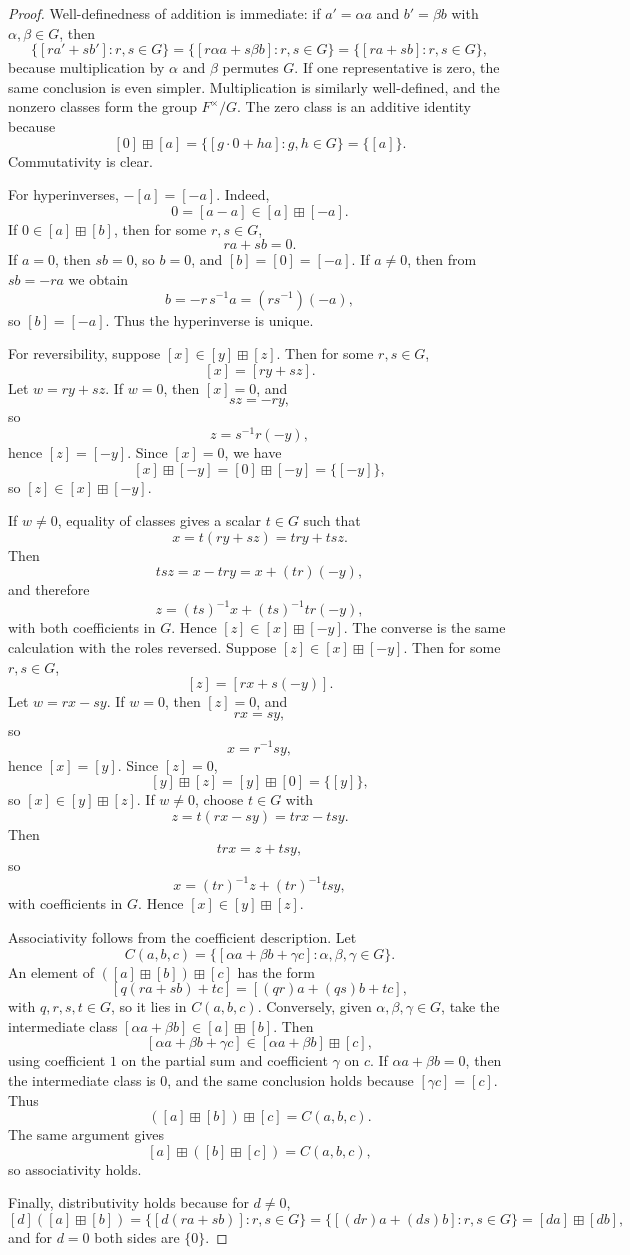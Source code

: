 \documentclass[12pt]{article}
\theoremstyle{definition}
\theoremstyle{remark}
\numberwithin{equation}{section}
\begin{document}
\begin{proof}
Well-definedness of addition is immediate: if \(a'=\alpha a\) and \(b'=\beta b\) with \(\alpha,\beta\in G\), then
\[
\{[r a'+s b']:r,s\in G\}
=
\{[r\alpha a+s\beta b]:r,s\in G\}
=
\{[ra+sb]:r,s\in G\},
\]
because multiplication by \(\alpha\) and \(\beta\) permutes \(G\). If one representative is zero, the same conclusion is even simpler. Multiplication is similarly well-defined, and the nonzero classes form the group \(F^\times/G\).
The zero class is an additive identity because
\[
[0]\boxplus[a]=\{[g\cdot0+h a]:g,h\in G\}=\{[a]\}.
\]
Commutativity is clear.

For hyperinverses, \(-[a]=[-a]\). Indeed,
\[
0=[a-a]\in [a]\boxplus[-a].
\]
If \(0\in[a]\boxplus[b]\), then for some \(r,s\in G\),
\[
ra+sb=0.
\]
If \(a=0\), then \(sb=0\), so \(b=0\), and \([b]=[0]=[-a]\). If \(a\neq0\), then from \(sb=-ra\) we obtain
\[
b=-r\,s^{-1}a=(rs^{-1})(-a),
\]
so \([b]=[-a]\). Thus the hyperinverse is unique.

For reversibility, suppose \([x]\in[y]\boxplus[z]\). Then for some \(r,s\in G\),
\[
[x]=[ry+sz].
\]
Let \(w=ry+sz\). If \(w=0\), then \([x]=0\), and
\[
sz=-ry,
\]
so
\[
z=s^{-1}r(-y),
\]
hence \([z]=[-y]\). Since \([x]=0\), we have
\[
[x]\boxplus[-y]=[0]\boxplus[-y]=\{[-y]\},
\]
so \([z]\in[x]\boxplus[-y]\).

If \(w\neq0\), equality of classes gives a scalar \(t\in G\) such that
\[
x=t(ry+sz)=try+tsz.
\]
Then
\[
tsz=x-try=x+(tr)(-y),
\]
and therefore
\[
z=(ts)^{-1}x+(ts)^{-1}tr(-y),
\]
with both coefficients in \(G\). Hence \([z]\in[x]\boxplus[-y]\).
The converse is the same calculation with the roles reversed. Suppose \([z]\in[x]\boxplus[-y]\). Then for some \(r,s\in G\),
\[
[z]=[rx+s(-y)].
\]
Let \(w=rx-sy\). If \(w=0\), then \([z]=0\), and
\[
rx=sy,
\]
so
\[
x=r^{-1}s y,
\]
hence \([x]=[y]\). Since \([z]=0\),
\[
[y]\boxplus[z]=[y]\boxplus[0]=\{[y]\},
\]
so \([x]\in[y]\boxplus[z]\). If \(w\neq0\), choose \(t\in G\) with
\[
z=t(rx-sy)=trx-tsy.
\]
Then
\[
trx=z+tsy,
\]
so
\[
x=(tr)^{-1}z+(tr)^{-1}ts y,
\]
with coefficients in \(G\). Hence \([x]\in[y]\boxplus[z]\).

Associativity follows from the coefficient description. Let
\[
C(a,b,c)=\{[\alpha a+\beta b+\gamma c]:\alpha,\beta,\gamma\in G\}.
\]
An element of \(([a]\boxplus[b])\boxplus[c]\) has the form
\[
[q(ra+sb)+tc]=[(qr)a+(qs)b+tc],
\]
with \(q,r,s,t\in G\), so it lies in \(C(a,b,c)\). Conversely, given \(\alpha,\beta,\gamma\in G\), take the intermediate class \([\alpha a+\beta b]\in[a]\boxplus[b]\). Then
\[
[\alpha a+\beta b+\gamma c]\in[\alpha a+\beta b]\boxplus[c],
\]
using coefficient \(1\) on the partial sum and coefficient \(\gamma\) on \(c\). If \(\alpha a+\beta b=0\), then the intermediate class is \(0\), and the same conclusion holds because \([\gamma c]=[c]\). Thus
\[
([a]\boxplus[b])\boxplus[c]=C(a,b,c).
\]
The same argument gives
\[
[a]\boxplus([b]\boxplus[c])=C(a,b,c),
\]
so associativity holds.

Finally, distributivity holds because for \(d\neq0\),
\[
[d]([a]\boxplus[b])
=
\{[d(ra+sb)]:r,s\in G\}
=
\{[(dr)a+(ds)b]:r,s\in G\}
=
[da]\boxplus[db],
\]
and for \(d=0\) both sides are \(\{0\}\).
\end{proof}
\end{document}
